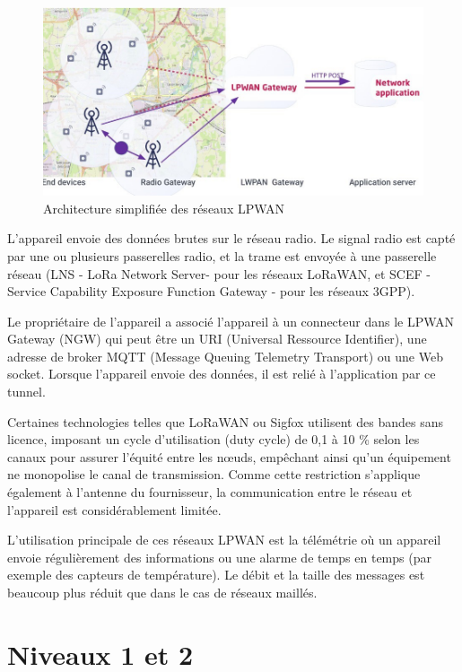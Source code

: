 \begin{figure}[tbp]
\centerline{\includegraphics[width=1\columnwidth]{Pictures/TolologieStar.jpg}}
\caption{Architecture simplifiée des réseaux LPWAN}
\label{fig-topo-star}
\end{figure}


L’appareil envoie des données brutes sur le réseau radio. Le signal radio est capté par une ou plusieurs passerelles radio, et la trame est envoyée à une passerelle réseau (LNS - LoRa Network Server- pour les réseaux LoRaWAN, et SCEF - Service Capability Exposure Function Gateway - pour les réseaux 3GPP).

Le propriétaire de l’appareil a associé l’appareil à un connecteur dans le LPWAN Gateway (NGW) qui peut être un URI (Universal Ressource Identifier), une adresse de broker MQTT (Message Queuing Telemetry Transport) ou une Web socket. Lorsque l’appareil envoie des données, il est relié à l’application par ce tunnel.

Certaines technologies telles que LoRaWAN ou Sigfox utilisent des bandes sans licence, imposant un cycle d’utilisation (duty cycle) de 0,1 à 10 \% selon les canaux pour assurer l’équité entre les nœuds, empêchant ainsi qu'un équipement ne monopolise le canal de transmission. Comme cette restriction s’applique également à l’antenne du fournisseur, la communication entre le réseau et l’appareil est considérablement limitée.

L’utilisation principale de ces réseaux LPWAN est la télémétrie où un appareil envoie régulièrement des informations ou une alarme de temps en temps (par exemple des capteurs de température). Le débit et la taille des messages est beaucoup plus réduit que dans le cas de réseaux maillés.

    \vspace{1em}

\section{Niveaux 1 et 2}

